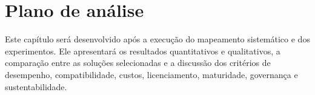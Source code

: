 \chapter{Plano de análise}

Este capítulo será desenvolvido após a execução do mapeamento sistemático e dos
experimentos. Ele apresentará os resultados quantitativos e qualitativos, a
comparação entre as soluções selecionadas e a discussão dos critérios de
desempenho, compatibilidade, custos, licenciamento, maturidade, governança e
sustentabilidade.
